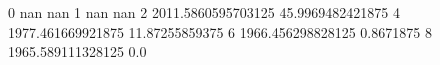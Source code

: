 0 nan nan
1 nan nan
2 2011.5860595703125 45.9969482421875
4 1977.461669921875 11.87255859375
6 1966.456298828125 0.8671875
8 1965.589111328125 0.0
